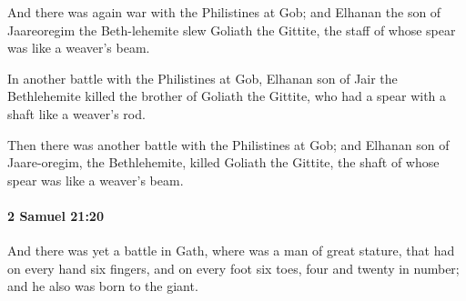 			\begin{versebox}
					\item[BHS] 
					\item[ASV] And there was again war with the Philistines at Gob; and Elhanan the son of Jaareoregim the Beth-lehemite slew Goliath the Gittite, the staff of whose spear was like a weaver's beam.
					\item[NIV] In another battle with the Philistines at Gob, Elhanan son of Jair the Bethlehemite killed the brother of Goliath the Gittite, who had a spear with a shaft like a weaver’s rod.
					\item[NRSV] Then there was another battle with the Philistines at Gob; and Elhanan son of Jaare-oregim, the Bethlehemite, killed Goliath the Gittite, the shaft of whose spear was like a weaver’s beam.
			\end{versebox}

		\paragraph{2 Samuel 21:20} %
			\label{2SAMUEL-21-20}

			And there was yet a battle in Gath, where was a man of great stature, that had on every hand six fingers, and on every foot six toes, four and twenty in number; and he also was born to the giant.

